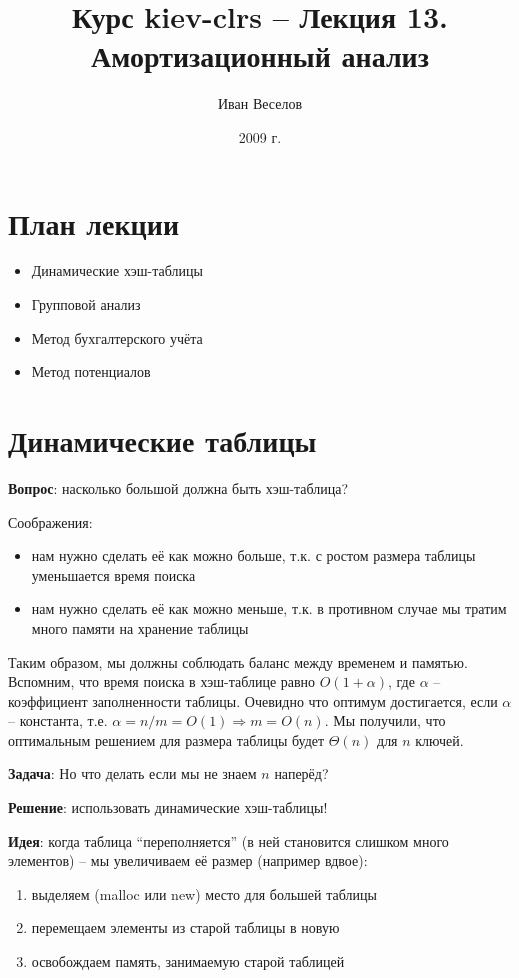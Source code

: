 \documentclass[a4paper,11pt]{article}
\author{Иван Веселов}
\title{Курс kiev-clrs -- Лекция 13. Амортизационный анализ}
\date{2009 г.}
\begin{document}
\maketitle
\tableofcontents
\newpage

\setlength{\parskip}{1ex plus 0.5ex minus 0.2ex}

\section{План лекции}
\begin{itemize}
\item Динамические хэш-таблицы
\item Групповой анализ
\item Метод бухгалтерского учёта
\item Метод потенциалов
\end{itemize}

\section{Динамические таблицы}

\textbf{Вопрос}: насколько большой должна быть хэш-таблица?

Соображения:
\begin{itemize}
\item нам нужно сделать её как можно больше, т.к. с ростом размера таблицы
  уменьшается время поиска
\item нам нужно сделать её как можно меньше, т.к. в противном случае мы тратим
  много памяти на хранение таблицы
\end{itemize}

Таким образом, мы должны соблюдать баланс между временем и памятью. Вспомним,
что время поиска в хэш-таблице равно $O(1 + \alpha)$, где $\alpha$ --
коэффициент заполненности таблицы. Очевидно что оптимум достигается, если
$\alpha$ -- константа, т.е. $\alpha = n/m = O(1) \Rightarrow m = O(n)$. Мы
получили, что оптимальным решением для размера таблицы будет $\Theta(n)$ для $n$
ключей.

\textbf{Задача}: Но что делать если мы не знаем $n$ наперёд?

\textbf{Решение}: использовать динамические хэш-таблицы!

\textbf{Идея}: когда таблица ``переполняется'' (в ней становится слишком много элементов)
-- мы увеличиваем её размер (например вдвое):

\begin{enumerate}
\item выделяем (malloc или new) место для большей таблицы
\item перемещаем элементы из старой таблицы в новую
\item освобождаем память, занимаемую старой таблицей
\end{enumerate}
\end{document}

